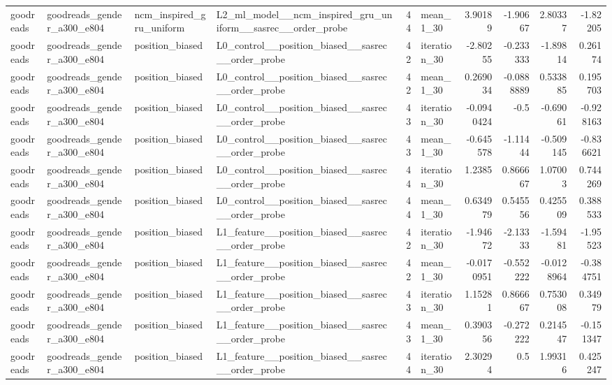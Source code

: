 \begin{table}[htbp!]
\begin{tabular}{llllrlrrrr}
goodreads & goodreads\_gender\_a300\_e804 & ncm\_inspired\_gru\_uniform & L2\_ml\_model\_\_ncm\_inspired\_gru\_uniform\_\_sasrec\_\_order\_probe & 44 & mean\_1\_30 & 3.90189 & -1.90667 & 2.80337 & -1.82205 \\
goodreads & goodreads\_gender\_a300\_e804 & position\_biased & L0\_control\_\_position\_biased\_\_sasrec\_\_order\_probe & 42 & iteration\_30 & -2.80255 & -0.233333 & -1.89814 & 0.26174 \\
goodreads & goodreads\_gender\_a300\_e804 & position\_biased & L0\_control\_\_position\_biased\_\_sasrec\_\_order\_probe & 42 & mean\_1\_30 & 0.269034 & -0.0888889 & 0.533885 & 0.195703 \\
goodreads & goodreads\_gender\_a300\_e804 & position\_biased & L0\_control\_\_position\_biased\_\_sasrec\_\_order\_probe & 43 & iteration\_30 & -0.0940424 & -0.5 & -0.69061 & -0.928163 \\
goodreads & goodreads\_gender\_a300\_e804 & position\_biased & L0\_control\_\_position\_biased\_\_sasrec\_\_order\_probe & 43 & mean\_1\_30 & -0.645578 & -1.11444 & -0.509145 & -0.836621 \\
goodreads & goodreads\_gender\_a300\_e804 & position\_biased & L0\_control\_\_position\_biased\_\_sasrec\_\_order\_probe & 44 & iteration\_30 & 1.2385 & 0.866667 & 1.07003 & 0.744269 \\
goodreads & goodreads\_gender\_a300\_e804 & position\_biased & L0\_control\_\_position\_biased\_\_sasrec\_\_order\_probe & 44 & mean\_1\_30 & 0.634979 & 0.545556 & 0.425509 & 0.388533 \\
goodreads & goodreads\_gender\_a300\_e804 & position\_biased & L1\_feature\_\_position\_biased\_\_sasrec\_\_order\_probe & 42 & iteration\_30 & -1.94672 & -2.13333 & -1.59481 & -1.95523 \\
goodreads & goodreads\_gender\_a300\_e804 & position\_biased & L1\_feature\_\_position\_biased\_\_sasrec\_\_order\_probe & 42 & mean\_1\_30 & -0.0170951 & -0.552222 & -0.0128964 & -0.384751 \\
goodreads & goodreads\_gender\_a300\_e804 & position\_biased & L1\_feature\_\_position\_biased\_\_sasrec\_\_order\_probe & 43 & iteration\_30 & 1.15281 & 0.866667 & 0.753008 & 0.34979 \\
goodreads & goodreads\_gender\_a300\_e804 & position\_biased & L1\_feature\_\_position\_biased\_\_sasrec\_\_order\_probe & 43 & mean\_1\_30 & 0.390356 & -0.272222 & 0.214547 & -0.151347 \\
goodreads & goodreads\_gender\_a300\_e804 & position\_biased & L1\_feature\_\_position\_biased\_\_sasrec\_\_order\_probe & 44 & iteration\_30 & 2.30294 & 0.5 & 1.99316 & 0.425247 \\

\end{tabular}
\end{table}
